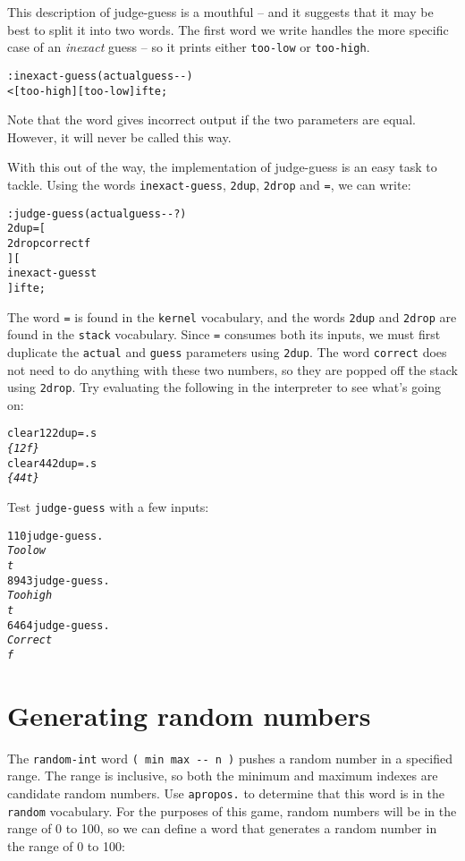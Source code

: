 \documentclass[english]{book}
\begin{document}
This description of judge-guess is a mouthful -- and it suggests that
it may be best to split it into two words. The first word we write
handles the more specific case of an \emph{inexact} guess -- so it
prints either \texttt{too-low} or \texttt{too-high}.

\begin{alltt}
: inexact-guess ( actual guess -{}- )
     < {[} too-high {]} {[} too-low {]} ifte ;
\end{alltt}
Note that the word gives incorrect output if the two parameters are
equal. However, it will never be called this way.

With this out of the way, the implementation of judge-guess is an
easy task to tackle. Using the words \texttt{inexact-guess}, \texttt{2dup}, \texttt{2drop} and \texttt{=}, we can write:

\begin{alltt}
: judge-guess ( actual guess -{}- ? )
    2dup = {[}
        2drop correct f
    {]} {[}
        inexact-guess t
    {]} ifte ;
\end{alltt}

The word \texttt{=} is found in the \texttt{kernel} vocabulary, and the words \texttt{2dup} and \texttt{2drop} are found in the \texttt{stack} vocabulary. Since \texttt{=}
consumes both its inputs, we must first duplicate the \texttt{actual} and \texttt{guess} parameters using \texttt{2dup}. The word \texttt{correct} does not need to do anything with these two numbers, so they are popped off the stack using \texttt{2drop}. Try evaluating the following
in the interpreter to see what's going on:

\begin{alltt}
clear 1 2 2dup = .s
\emph{\{ 1 2 f \}}
clear 4 4 2dup = .s
\emph{\{ 4 4 t \}}
\end{alltt}

Test \texttt{judge-guess} with a few inputs:

\begin{alltt}
1 10 judge-guess .
\emph{Too low}
\emph{t}
89 43 judge-guess .
\emph{Too high}
\emph{t}
64 64 judge-guess .
\emph{Correct}
\emph{f}
\end{alltt}

\section{Generating random numbers}

The \texttt{random-int} word \texttt{( min max -{}- n )} pushes a
random number in a specified range. The range is inclusive, so both
the minimum and maximum indexes are candidate random numbers. Use
\texttt{apropos.} to determine that this word is in the \texttt{random}
vocabulary. For the purposes of this game, random numbers will be
in the range of 0 to 100, so we can define a word that generates a
random number in the range of 0 to 100:
\end{document}
